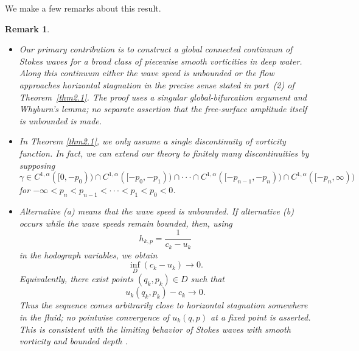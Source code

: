\documentclass[11pt,reqno]{amsart}
\numberwithin{equation}{section}
\newtheorem{remark}[theorem]{Remark}
\theoremstyle{definition}
\theoremstyle{remark}
\begin{document}
We make a few remarks about this result.

\begin{remark}

\begin{itemize}
  \item [(1)] Our primary contribution is to construct a global
connected continuum of Stokes waves for a broad class of piecewise
smooth vorticities in deep water.  Along this continuum either the
wave speed is unbounded or the flow approaches horizontal stagnation
in the precise sense stated in part~(2) of Theorem~\ref{thm2.1}.
The proof uses a singular global-bifurcation argument and Whyburn's
lemma; no separate assertion that the free-surface amplitude itself
is unbounded is made.

\item [(2)] In Theorem \ref{thm2.1}, we only assume a single discontinuity
of vorticity function. In fact, we can extend our theory to finitely
many discontinuities by supposing
$$
\gamma\in C^{1,\alpha}([0,-p_0))\cap C^{1,\alpha}([-p_0,
-p_1))\cap\cdot\cdot\cdot\cap C^{1,\alpha}([-p_{n-1},-p_n))\cap
C^{1,\alpha}([-p_n, \infty))
$$
for $-\infty<p_n<p_{n-1}<\cdot\cdot\cdot<p_1<p_0<0$.


\item [(3)] Alternative (a) means that the wave speed is unbounded.
If alternative (b) occurs while the wave speeds remain bounded, then,
using
\[
 h_{k,p}=\frac{1}{c_k-u_k}
\]
in the hodograph variables, we obtain
\[
 \inf_D(c_k-u_k)\longrightarrow0.
\]
Equivalently, there exist points $(q_k,p_k)\in D$ such that
\[
 u_k(q_k,p_k)-c_k\longrightarrow0.
\]
Thus the sequence comes arbitrarily close to horizontal stagnation
somewhere in the fluid; no pointwise convergence of $u_k(q,p)$ at a
fixed point is asserted.  This is consistent with the limiting
behavior of Stokes waves with smooth vorticity and bounded depth
\cite{Constantin,ConstantinS}.
\end{itemize}
\end{remark}
\end{document}
